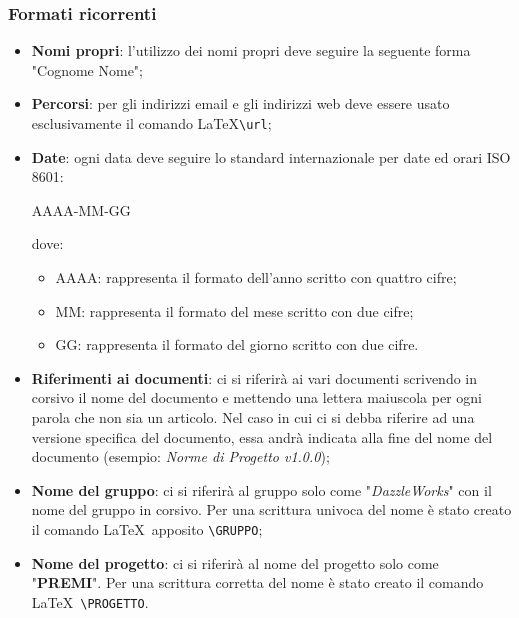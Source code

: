 \subsubsection{Formati ricorrenti}
\begin{itemize}
	\item \textbf{Nomi propri}: l'utilizzo dei nomi propri deve seguire la seguente forma "Cognome Nome";
	\item \textbf{Percorsi}: per gli indirizzi email e gli indirizzi web deve essere usato esclusivamente il comando \LaTeX  \verb|\url|;
	\item \textbf{Date}:  ogni data deve seguire lo standard internazionale per date ed orari ISO 8601:
	\begin{center}
		AAAA-MM-GG
	\end{center}
	dove:
	\begin{itemize}
		\item AAAA: rappresenta il formato dell'anno scritto con quattro cifre;
		\item MM: rappresenta il formato del mese scritto con due cifre;
		\item GG: rappresenta il formato del giorno scritto con due cifre.
	\end{itemize}
	\item \textbf{Riferimenti ai documenti}: ci si riferirà ai vari documenti scrivendo in corsivo il nome del documento e mettendo una lettera maiuscola per ogni parola che non sia un articolo. Nel caso in cui ci si debba riferire ad una versione specifica del documento, essa andrà indicata alla fine  del nome del documento (esempio: \textit{Norme di Progetto v1.0.0});
	\item \textbf{Nome del gruppo}: ci si riferirà al gruppo solo come "\textit{DazzleWorks}" con il nome del gruppo in corsivo. Per una scrittura univoca del nome è stato creato il comando \LaTeX\ apposito \verb|\GRUPPO|;
	\item \textbf{Nome del progetto}: ci si riferirà al nome del progetto solo come "\textbf{PREMI}". Per una scrittura corretta del nome è stato creato il comando \LaTeX\ \verb|\PROGETTO|.
\end{itemize}

